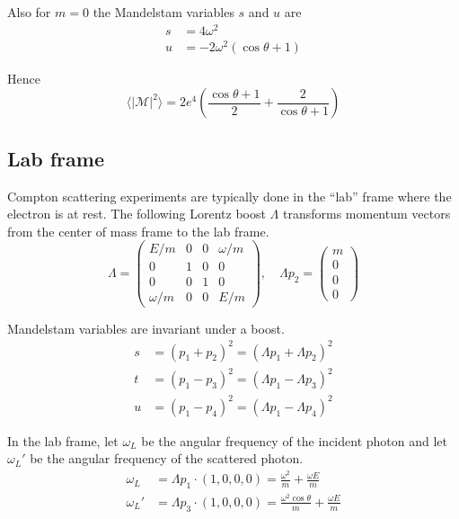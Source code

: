 \documentclass[12pt]{article}
\begin{document}
Also for $m=0$ the Mandelstam variables $s$ and $u$ are
\begin{align*}
s&=4\omega^2
\\
u&=-2\omega^2(\cos\theta+1)
\end{align*}

Hence
\begin{equation*}
\langle|\mathcal{M}|^2\rangle
=2e^4\left(
\frac{\cos\theta+1}{2}+\frac{2}{\cos\theta+1}
\right)
\end{equation*}

\subsection*{Lab frame}
Compton scattering experiments are typically done in the ``lab'' frame where the electron is at rest.
The following Lorentz boost $\Lambda$ transforms momentum vectors from
the center of mass frame to the lab frame.
\begin{equation*}
\Lambda=
\begin{pmatrix}
E/m & 0 & 0 & \omega/m\\
0 & 1 & 0 & 0\\
0 & 0 & 1 & 0\\
\omega/m & 0 & 0 & E/m
\end{pmatrix},
\quad
\Lambda p_2=\begin{pmatrix}m \\ 0 \\ 0 \\ 0\end{pmatrix}
\end{equation*}

\noindent
Mandelstam variables are invariant under a boost.
\begin{equation*}
\begin{aligned}
s&=(p_1+p_2)^2=(\Lambda p_1+\Lambda p_2)^2
\\
t&=(p_1-p_3)^2=(\Lambda p_1-\Lambda p_3)^2
\\
u&=(p_1-p_4)^2=(\Lambda p_1-\Lambda p_4)^2
\end{aligned}
\end{equation*}

\noindent
In the lab frame, let $\omega_L$ be the angular frequency of the incident photon
and let $\omega_L'$ be the angular frequency of the scattered photon.
\begin{equation*}
\begin{aligned}
\omega_L&=\Lambda p_1\cdot(1,0,0,0)=\frac{\omega^2}{m}+\frac{\omega E}{m}
\\
\omega_L'&=\Lambda p_3\cdot(1,0,0,0)=\frac{\omega^2\cos\theta}{m}+\frac{\omega E}{m}
\end{aligned}
\end{equation*}
\end{document}
